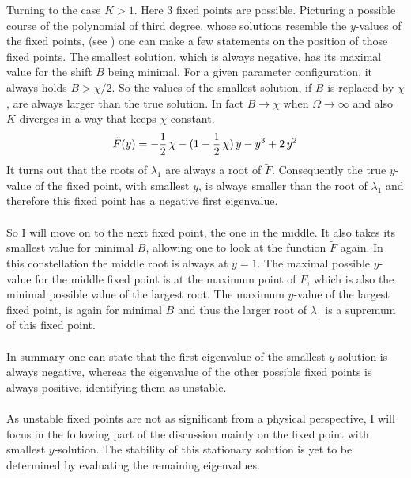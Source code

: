 Turning to the case $K>1$. Here 3 fixed points are possible. Picturing a possible course of the polynomial of third degree, whose solutions resemble the $y$-values of the fixed points, (see ) one can make a few statements on the position of those fixed points. The smallest solution, which is always negative, has its maximal value for the shift $B$ being minimal. For a given parameter configuration, it always holds $B>\chi/2$. So the values of the smallest solution, if $B$ is replaced by $\chi$, are always larger than the true solution. In fact $B\rightarrow\chi$ when $\Omega\rightarrow\infty$ and also $K$ diverges in a way that keeps $\chi$ constant.
\begin{align*}
    \tilde{F}({y})=-\frac{1}{2}\,\chi-(1-\frac{1}{2}\,\chi)\,{y}    - {y}^3+2\,{y}^2
\end{align*}
It turns out that the roots of $\lambda_1$ are always a root of $\tilde{F}$. Consequently the true $y$-value of the fixed point, with smallest $y$, is always smaller than the root of $\lambda_1$ and therefore this fixed point has a negative first eigenvalue.\\\\
So I will move on to the next fixed point, the one in the middle. It also takes its smallest value for minimal $B$, allowing one to look at the function $\tilde{F}$ again. In this constellation the middle root is always at ${y}=1$. The maximal possible $y$-value for the middle fixed point is at the maximum point of $F$, which is also the minimal possible value of the largest root. The maximum $y$-value of the largest fixed point, is again for minimal $B$ and thus the larger root of $\lambda_1$ is a supremum of this fixed point.\\\\
In summary one can state that the first eigenvalue of the smallest-$y$ solution is always negative, whereas the eigenvalue of the other possible fixed points is always positive, identifying them as unstable. \\\\As unstable fixed points are not as significant from a physical perspective, I will focus in the following part of the discussion mainly on the fixed point with smallest $y$-solution. The stability of this stationary solution is yet to be determined by evaluating the remaining eigenvalues.
